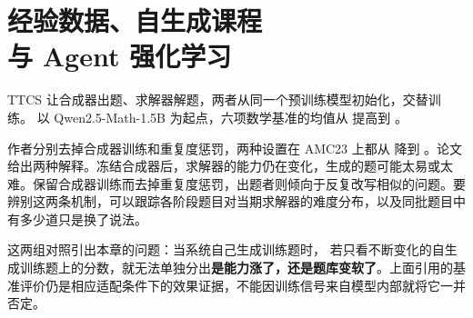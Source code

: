 \chapter[经验数据、自生成课程与 Agent 强化学习]{经验数据、自生成课程\\与 Agent 强化学习}
\label{ch11}


\begin{failurebox}
TTCS 让合成器出题、求解器解题，两者从同一个预训练模型初始化，交替训练。
以 Qwen2.5-Math-1.5B 为起点，六项数学基准的均值从  提高到 。

作者分别去掉合成器训练和重复度惩罚，两种设置在 AMC23 上都从  降到 。论文给出两种解释。冻结合成器后，求解器的能力仍在变化，生成的题可能太易或太难。保留合成器训练而去掉重复度惩罚，出题者则倾向于反复改写相似的问题。要辨别这两条机制，可以跟踪各阶段题目对当期求解器的难度分布，以及同批题目中有多少道只是换了说法\cite[§5.4及表3]{ttcs-2601}。

这两组对照引出本章的问题：当系统自己生成训练题时，
若只看不断变化的自生成训练题上的分数，就无法单独分出\textbf{是能力涨了，还是题库变软了}。上面引用的基准评价仍是相应适配条件下的效果证据，不能因训练信号来自模型内部就将它一并否定。
\end{failurebox}


